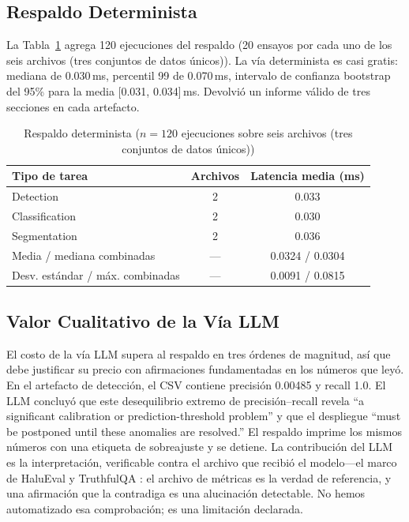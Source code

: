 \documentclass[10pt,twocolumn,letterpaper]{article}
\begin{document}
\subsection{Respaldo Determinista}
La Tabla~\ref{tab:fallback} agrega 120 ejecuciones del respaldo (20 ensayos por cada uno de los seis archivos (tres conjuntos de datos únicos)). La vía determinista es casi gratis: mediana de 0.030\,ms, percentil 99 de 0.070\,ms, intervalo de confianza bootstrap del 95\% para la media [0.031, 0.034]\,ms. Devolvió un informe válido de tres secciones en cada artefacto.

\begin{table}[htbp]
\centering
\caption{Respaldo determinista ($n=120$ ejecuciones sobre seis archivos (tres conjuntos de datos únicos))}
\label{tab:fallback}
\begin{tabular}{@{}lcc@{}}
\toprule
Tipo de tarea & Archivos & Latencia media (ms) \\
\midrule
Detection & 2 & 0.033 \\
Classification & 2 & 0.030 \\
Segmentation & 2 & 0.036 \\
\midrule
Media / mediana combinadas & --- & 0.0324 / 0.0304 \\
Desv. estándar / máx. combinadas & --- & 0.0091 / 0.0815 \\
\bottomrule
\end{tabular}
\end{table}

\subsection{Valor Cualitativo de la Vía LLM}
El costo de la vía LLM supera al respaldo en tres órdenes de magnitud, así que debe justificar su precio con afirmaciones fundamentadas en los números que leyó. En el artefacto de detección, el CSV contiene precisión 0.00485 y recall 1.0. El LLM concluyó que este desequilibrio extremo de precisión--recall revela ``a significant calibration or prediction-threshold problem'' y que el despliegue ``must be postponed until these anomalies are resolved.'' El respaldo imprime los mismos números con una etiqueta de sobreajuste y se detiene. La contribución del LLM es la interpretación, verificable contra el archivo que recibió el modelo---el marco de HaluEval y TruthfulQA \cite{lihalu2023halu,lin2022truthfulqa}: el archivo de métricas es la verdad de referencia, y una afirmación que la contradiga es una alucinación detectable. No hemos automatizado esa comprobación; es una limitación declarada.
\end{document}
